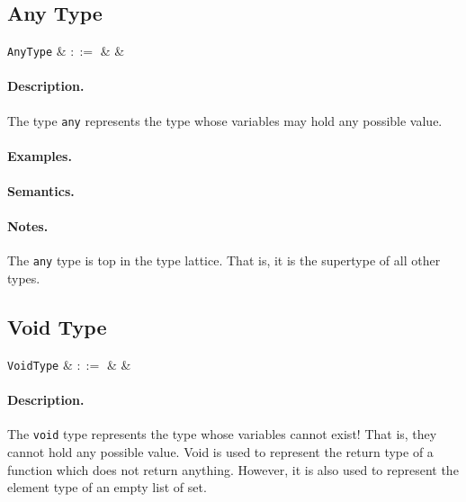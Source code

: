 \subsection{Any Type}

\begin{syntax}
  \verb+AnyType+ & $::=$ &  &\\
\end{syntax}

\paragraph{Description.}  The type \lstinline{any} represents the type whose variables may hold any possible value.

\paragraph{Examples.}

\paragraph{Semantics.}

\paragraph{Notes.} The \lstinline{any} type is top in the type
lattice.  That is, it is the supertype of all other types.


\subsection{Void Type}

\begin{syntax}
   \verb+VoidType+ & $::=$ &  &\\
\end{syntax}

\paragraph{Description.} The \lstinline{void} type represents the type whose variables cannot exist! That is, they cannot hold any possible value. Void is used to represent the return type of a function which does not return anything. However, it is also
used to represent the element type of an empty list of set. 

